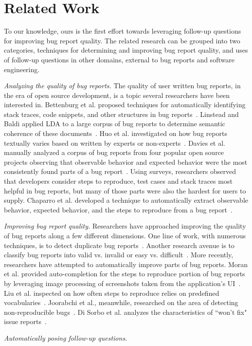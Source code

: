 \section{Related Work}
To our knowledge, ours is the first effort towards leveraging follow-up questions for
improving bug report quality. The related research can be grouped into two categories, techniques
for determining and improving bug report quality, and uses of follow-up questions in other domains,
external to bug reports and software engineering.

\noindent
{\em Analyzing the quality of bug reports.} The quality of user written bug reports,
in the era of open source development, is a topic several researchers have been interested
in. Bettenburg et al. proposed techniques for automatically identifying stack traces, code
snippets, and other structures in bug reports~\cite{bettenburg08extracting}. Linstead and Baldi
applied LDA to a large corpus of bug reports to determine semantic coherence of these
documents~\cite{linstead09mining}. Huo et al. investigated on how bug reports textually varies based on written by experts or non-experts~\cite{Huo2014AnES}. Davies et al. manually analyzed a corpus of bug reports
from four popular open source projects observing
that observable behavior and expected behavior were the most consistently found parts
of a bug report~\cite{davies14whats}. Using surveys, researchers observed that developers
consider steps to reproduce, test cases and stack traces most helpful in bug reports, but
many of those parts were also the hardest for users to supply. Chaparro et al. developed a
technique to automatically extract observable behavior, expected behavior, and the steps to
reproduce from a bug report~\cite{chaparro17detecting}.

\noindent
{\em Improving bug report quality.} Researchers have approached improving the quality of
bug reports along a few different dimensions. One line of work, with numerous techniques,
is to detect duplicate bug reports~\cite{chaparro19reformulating}. Another research avenue
is to classify bug reports into valid vs. invalid or easy vs. difficult~\cite{fan20chaff,hooimeijer07modeling}.
More recently, researchers have attempted to automatically improve parts of bug reports. Moran et al. provided
auto-completion for the steps to reproduce portion of bug reports by leveraging image processing
of screenshots taken from the application's UI~\cite{moran15autocompleting}. Liu et al. inspected on how often steps to reproduce relies on predefined vocabularies~\cite{liu2020automated}. Joorabchi et al., meanwhile, researched on the area of detecting non-reproducible bugs~\cite{erfani2014works}. Di Sorbo et al. analyzes the characteristics of ``won't fix" issue reports~\cite{Sorbo2019WontWF}.

\noindent
{\em Automatically posing follow-up questions.} 
